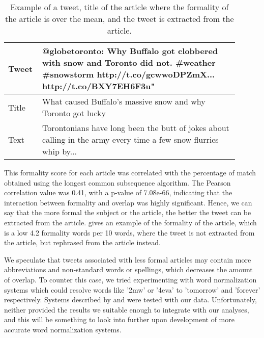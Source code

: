 \begin{table}[!htbp]
\centering
\begin{tabular}{|p{0.1\linewidth}|p{0.8\linewidth}|}
\hline
Tweet &  @globetoronto: Why Buffalo got clobbered with snow and Toronto did not. \#weather \#snowstorm http://t.co/gcwwoDPZmX... http://t.co/BXY7EH6F3u" \\ \hline
Title & What caused Buffalo’s massive snow and why Toronto got lucky \\  \hline
Text  & Torontonians have long been the butt of jokes about calling in the army every time a few snow flurries whip by... \\ \hline
\end{tabular}
\caption[Example of formality in article affecting tweet]{Example of a tweet, title of the article where the formality of the article is over the mean, and the tweet is extracted from the article.}
\label{tab:formalexample}
\end{table}

This formality score for each article was correlated with the percentage of match obtained using the longest common subsequence algorithm. The Pearson correlation value was 0.41, with a p-value of 7.08e-66, indicating that the interaction between formality and overlap was highly significant. Hence, we can say that the more formal the subject or the article, the better the tweet can be extracted from the article.  gives an example of the formality of the article, which is a low 4.2 formality words per 10 words, where the tweet is not extracted from the article, but rephrased from the article instead.

We speculate that tweets associated with less formal articles may contain more abbreviations and non-standard words or spellings, which decreases the amount of overlap. To counter this case, we tried experimenting with word normalization systems which could resolve words like '2mw' or '4eva' to 'tomorrow' and 'forever' respectively. Systems described by \cite{yang2013log} and \cite{gouws2011contextual} were tested with our data. Unfortunately, neither provided the results we suitable enough to integrate with our analyses, and this will be something to look into further upon development of more accurate word normalization systems. 

